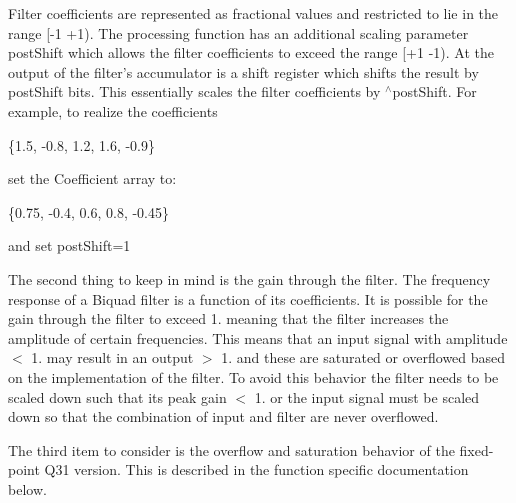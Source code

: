 \begin{DoxyParagraph}{}
Filter coefficients are represented as fractional values and restricted to lie in the range {\ttfamily \mbox{[}-\/1 +1)}. The processing function has an additional scaling parameter {\ttfamily post\-Shift} which allows the filter coefficients to exceed the range {\ttfamily \mbox{[}+1 -\/1)}. At the output of the filter's accumulator is a shift register which shifts the result by {\ttfamily post\-Shift} bits.  This essentially scales the filter coefficients by {$^\wedge$post\-Shift}. For example, to realize the coefficients 
\begin{DoxyPre}    
   \{1.5, -0.8, 1.2, 1.6, -0.9\}    
\end{DoxyPre}
 set the Coefficient array to\-: 
\begin{DoxyPre}    
   \{0.75, -0.4, 0.6, 0.8, -0.45\}    
\end{DoxyPre}
 and set {\ttfamily post\-Shift=1}
\end{DoxyParagraph}
\begin{DoxyParagraph}{}
The second thing to keep in mind is the gain through the filter. The frequency response of a Biquad filter is a function of its coefficients. It is possible for the gain through the filter to exceed 1. meaning that the filter increases the amplitude of certain frequencies. This means that an input signal with amplitude $<$ 1. may result in an output $>$ 1. and these are saturated or overflowed based on the implementation of the filter. To avoid this behavior the filter needs to be scaled down such that its peak gain $<$ 1. or the input signal must be scaled down so that the combination of input and filter are never overflowed.
\end{DoxyParagraph}
\begin{DoxyParagraph}{}
The third item to consider is the overflow and saturation behavior of the fixed-\/point Q31 version. This is described in the function specific documentation below. 
\end{DoxyParagraph}


